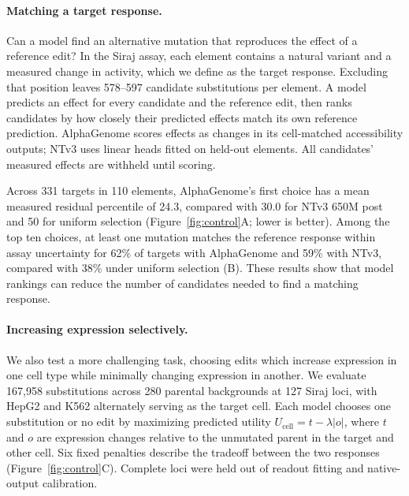 \paragraph{Matching a target response.}

Can a model find an alternative mutation that reproduces the effect of a reference edit? In the Siraj assay, each element contains a natural variant and a measured change in activity, which we define as the target response. Excluding that position leaves 578–597 candidate substitutions per element. A model predicts an effect for every candidate and the reference edit, then ranks candidates by how closely their predicted effects match its own reference prediction. AlphaGenome scores effects as changes in its cell-matched accessibility outputs; NTv3 uses linear heads fitted on held-out elements. All candidates' measured effects are withheld until scoring.


Across 331 targets in 110 elements, AlphaGenome's first choice
has a mean measured residual percentile of 24.3, compared with
30.0 for NTv3 650M post and 50 for uniform selection
(Figure~\ref{fig:control}A; lower is better).
Among the top ten choices, at least one mutation matches the
reference response within assay uncertainty for 62\% of targets
with AlphaGenome and 59\% with NTv3, compared with 38\% under
uniform selection (B). These results show that model rankings
can reduce the number of candidates needed to find a matching
response.



\paragraph{Increasing expression selectively.}
\label{sec:cell-selective}

We also test a more challenging task, choosing edits which increase expression in one cell
type while minimally changing expression in another. We evaluate 167,958
substitutions across 280 parental backgrounds at 127 Siraj loci,
with HepG2 and K562 alternately serving as the target cell.
Each model chooses one substitution or no edit by maximizing
predicted utility $U_{\mathrm{cell}}=t-\lambda|o|$, where $t$
and $o$ are expression changes relative to the unmutated parent
in the target and other cell. Six fixed penalties describe the
tradeoff between the two responses
(Figure~\ref{fig:control}C). Complete loci were held out of readout fitting and native-output calibration.

